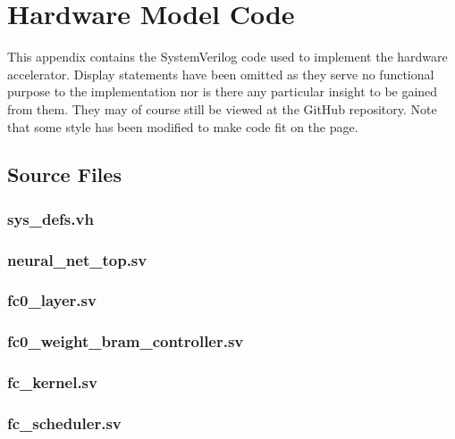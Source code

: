 \chapter{Hardware Model Code}\label{app:hw}
This appendix contains the SystemVerilog code used to implement the hardware accelerator. Display statements have been omitted as they serve no functional purpose to the implementation nor is there any particular insight to be gained from them. They may of course still be viewed at the GitHub repository. Note that some style has been modified to make code fit on the page.


\lstset{basicstyle=\footnotesize\ttfamily, captionpos=t}
\section{Source Files}
\subsection{sys\_defs.vh}

\pagebreak

\subsection{neural\_net\_top.sv}

\pagebreak

\subsection{fc0\_layer.sv}

\pagebreak

\subsection{fc0\_weight\_bram\_controller.sv}

\pagebreak

\subsection{fc\_kernel.sv}

\pagebreak

\subsection{fc\_scheduler.sv}

\pagebreak

